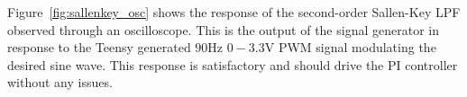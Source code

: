 Figure~\ref{fig:sallenkey_osc} shows the response of the second-order Sallen-Key
LPF observed through an oscilloscope. This is the output of the signal generator
in response to the Teensy generated $90$\unit{\hertz} $0-3.3$\unit{\volt} PWM
signal modulating the desired sine wave. This response is satisfactory and
should drive the PI controller without any issues.
